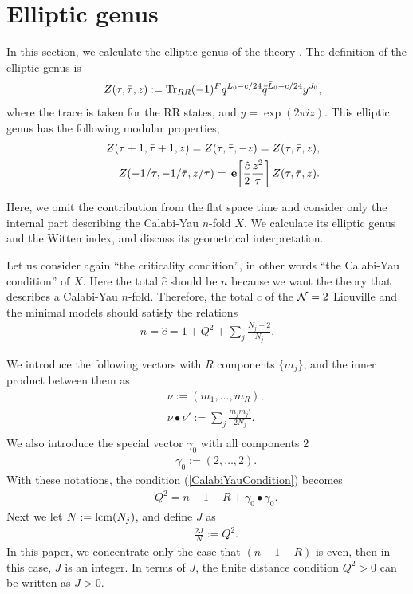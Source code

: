 \documentclass[a4paper,12pt]{article}
\numberwithin{equation}{section}
\newcommand{\Ncal}{{\cal N}}
\newcommand{\ch}{\hat{c}}
\newcommand{\e}[1]{\,{\bf e}\!\left[#1\right]}
\newcommand{\lcm}{{\rm lcm}}
\newcommand{\taub}{\bar{\tau}}
\newcommand{\nn}{\nonumber}
\newcommand{\Tr}{{\rm Tr}}
\begin{document}
\section{Elliptic genus}\label{Sec4}

In this section, we calculate the elliptic genus of the theory
\cite{KYY9306}. The definition of the elliptic genus is
\begin{eqnarray*}
 && Z(\tau,\taub,z):=\Tr_{RR}(-1)^{F}q^{L_0-c/24}\bar q^{\bar L_0-c/24}y^{J_0},
\end{eqnarray*}
where the trace is taken for the RR states, and $y=\exp(2\pi iz)$. This
elliptic genus has the following modular properties;
\begin{eqnarray}
 && Z(\tau+1,\taub+1,z)=Z(\tau,\taub,-z)=Z(\tau,\taub,z),\nn\\
 && Z(-1/\tau,-1/\taub,z/\tau)=\e{\frac{\ch}{2}\frac{z^2}{\tau}}
Z(\tau,\taub,z). \label{EllipticModular}
\end{eqnarray}

Here, we omit the contribution from the flat space time and
consider only the internal part describing
the Calabi-Yau $n$-fold $X$. We calculate its elliptic genus and
the Witten index, and discuss its geometrical interpretation.

Let us consider again ``the criticality condition'', in other
words ``the Calabi-Yau condition'' of $X$.
Here the total $\ch$ should be $n$ because we want the theory
that describes a Calabi-Yau $n$-fold. Therefore, the total $\ch$ of 
the $\Ncal=2$ Liouville and the minimal models should satisfy
the relations
\begin{eqnarray}
 n=\ch=1+Q^2+\sum_j\frac{N_j-2}{N_j}.\label{CalabiYauCondition}
\end{eqnarray}

We introduce the following
vectors with $R$ components $\{m_j\}$, and the inner product between them as
\begin{eqnarray*}
 && \nu:=(m_1,\dots,m_R),\\
 && \nu\bullet\nu':=\sum_j\frac{m_jm_j'}{2N_j}.\\
\end{eqnarray*}
We also introduce the special vector $\gamma_0$ with all components $2$
\begin{eqnarray*}
 &&\gamma_0:=(2,\dots,2).
\end{eqnarray*}
With these notations, the condition
(\ref{CalabiYauCondition}) becomes
\begin{eqnarray*}
 && Q^2=n-1-R+\gamma_0\bullet\gamma_0.
\end{eqnarray*}
Next we let $N:=\lcm(N_j)$, and define $J$ as
\begin{eqnarray}
 && \frac{2J}{N}:=Q^2. \label{DefJ2}
\end{eqnarray}
In this paper, we concentrate only the case that $(n-1-R)$ is even, then
in this case, $J$ is an integer. In terms of $J$, the finite distance
condition $Q^2>0$ can be written as $J>0$.
\end{document}
